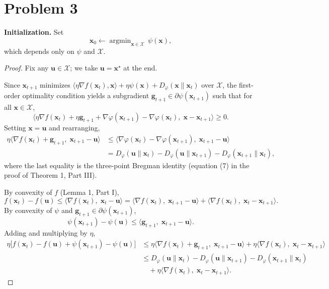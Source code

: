 \section*{Problem 3}

\textbf{Initialization.} Set
\[
\mathbf{x}_0 \leftarrow \operatorname{argmin}_{\mathbf{x} \in \mathcal{X}}\, \psi(\mathbf{x}),
\]
which depends only on $\psi$ and $\mathcal{X}$.

\begin{proof}
Fix any $\mathbf{u} \in \mathcal{X}$; we take $\mathbf{u} = \mathbf{x}^\star$ at the end.

Since $\mathbf{x}_{t+1}$ minimizes $\langle \eta \nabla f(\mathbf{x}_t), \mathbf{x}\rangle + \eta\psi(\mathbf{x}) + D_\varphi(\mathbf{x} \| \mathbf{x}_t)$ over $\mathcal{X}$, the first-order optimality condition yields a subgradient $\mathbf{g}_{t+1} \in \partial\psi(\mathbf{x}_{t+1})$ such that for all $\mathbf{x} \in \mathcal{X}$,
\[
\langle \eta \nabla f(\mathbf{x}_t) + \eta \mathbf{g}_{t+1} + \nabla\varphi(\mathbf{x}_{t+1}) - \nabla\varphi(\mathbf{x}_t),\; \mathbf{x} - \mathbf{x}_{t+1}\rangle \ge 0.
\]
Setting $\mathbf{x} = \mathbf{u}$ and rearranging,
\begin{align*}
\eta\langle \nabla f(\mathbf{x}_t) + \mathbf{g}_{t+1},\; \mathbf{x}_{t+1} - \mathbf{u}\rangle
&\le \langle \nabla\varphi(\mathbf{x}_t) - \nabla\varphi(\mathbf{x}_{t+1}),\; \mathbf{x}_{t+1} - \mathbf{u}\rangle \\
&= D_\varphi(\mathbf{u} \| \mathbf{x}_t) - D_\varphi(\mathbf{u} \| \mathbf{x}_{t+1}) - D_\varphi(\mathbf{x}_{t+1} \| \mathbf{x}_t),
\end{align*}
where the last equality is the three-point Bregman identity (equation (7) in the proof of Theorem 1, Part III).

By convexity of $f$ (Lemma 1, Part I),
\[
f(\mathbf{x}_t) - f(\mathbf{u}) \le \langle \nabla f(\mathbf{x}_t),\; \mathbf{x}_t - \mathbf{u}\rangle = \langle \nabla f(\mathbf{x}_t),\; \mathbf{x}_{t+1} - \mathbf{u}\rangle + \langle \nabla f(\mathbf{x}_t),\; \mathbf{x}_t - \mathbf{x}_{t+1}\rangle.
\]
By convexity of $\psi$ and $\mathbf{g}_{t+1} \in \partial\psi(\mathbf{x}_{t+1})$,
\[
\psi(\mathbf{x}_{t+1}) - \psi(\mathbf{u}) \le \langle \mathbf{g}_{t+1},\; \mathbf{x}_{t+1} - \mathbf{u}\rangle.
\]
Adding and multiplying by $\eta$,
\begin{align*}
\eta\bigl[f(\mathbf{x}_t) - f(\mathbf{u}) + \psi(\mathbf{x}_{t+1}) - \psi(\mathbf{u})\bigr]
&\le \eta\langle \nabla f(\mathbf{x}_t) + \mathbf{g}_{t+1},\; \mathbf{x}_{t+1} - \mathbf{u}\rangle + \eta\langle \nabla f(\mathbf{x}_t),\; \mathbf{x}_t - \mathbf{x}_{t+1}\rangle \\
&\le D_\varphi(\mathbf{u} \| \mathbf{x}_t) - D_\varphi(\mathbf{u} \| \mathbf{x}_{t+1}) - D_\varphi(\mathbf{x}_{t+1} \| \mathbf{x}_t) \\
&\quad + \eta\langle \nabla f(\mathbf{x}_t),\; \mathbf{x}_t - \mathbf{x}_{t+1}\rangle.
\end{align*}


\end{proof}
